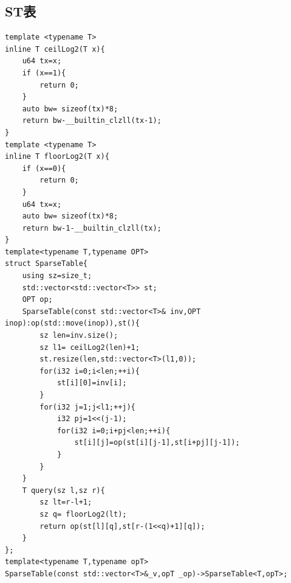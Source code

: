 \documentclass[UTF8,twoside]{ctexart}
\begin{document}
\subsection{ST表}
\begin{lstlisting}
template <typename T>
inline T ceilLog2(T x){
    u64 tx=x;
    if (x==1){
        return 0;
    }
    auto bw= sizeof(tx)*8;
    return bw-__builtin_clzll(tx-1);
}
template <typename T>
inline T floorLog2(T x){
    if (x==0){
        return 0;
    }
    u64 tx=x;
    auto bw= sizeof(tx)*8;
    return bw-1-__builtin_clzll(tx);
}
template<typename T,typename OPT>
struct SparseTable{
    using sz=size_t;
    std::vector<std::vector<T>> st;
    OPT op;
    SparseTable(const std::vector<T>& inv,OPT inop):op(std::move(inop)),st(){
        sz len=inv.size();
        sz l1= ceilLog2(len)+1;
        st.resize(len,std::vector<T>(l1,0));
        for(i32 i=0;i<len;++i){
            st[i][0]=inv[i];
        }
        for(i32 j=1;j<l1;++j){
            i32 pj=1<<(j-1);
            for(i32 i=0;i+pj<len;++i){
                st[i][j]=op(st[i][j-1],st[i+pj][j-1]);
            }
        }
    }
    T query(sz l,sz r){
        sz lt=r-l+1;
        sz q= floorLog2(lt);
        return op(st[l][q],st[r-(1<<q)+1][q]);
    }
};
template<typename T,typename opT>
SparseTable(const std::vector<T>&_v,opT _op)->SparseTable<T,opT>;
\end{lstlisting}
\end{document}
